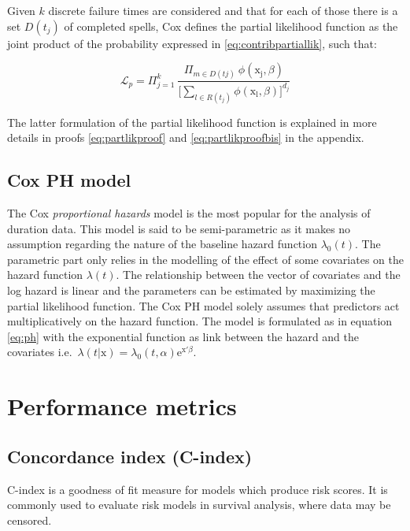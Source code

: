 \documentclass[
]{book}
\begin{document}
Given \(k\) discrete failure times are considered and that for each of those there is a set \(D(t_j)\) of completed spells, Cox defines the partial likelihood function as the joint product of the probability expressed in \eqref{eq:contribpartiallik}, such that:

\begin{equation}
  \mathcal{L}_p = \Pi_{j=1}^{k} \ \frac{\Pi_{m \in D(tj)} \ \phi(\mathrm{x_j}, \beta)}{\Big[\sum_{l \in R(t_j)} \phi(\mathrm{x_l}, \beta)\Big]^{d_j}}
  \label{eq:partlik}
\end{equation}

The latter formulation of the partial likelihood function is explained in more details in proofs \eqref{eq:partlikproof} and \eqref{eq:partlikproofbis} in the appendix.

\hypertarget{coxph}{%
\subsection{Cox PH model}\label{coxph}}

The Cox \emph{proportional hazards} model is the most popular for the analysis of duration data. This model is said to be semi-parametric as it makes no assumption regarding the nature of the baseline hazard function \(\lambda_0(t)\). The parametric part only relies in the modelling of the effect of some covariates on the hazard function \(\lambda(t)\). The relationship between the vector of covariates and the log hazard is linear and the parameters can be estimated by maximizing the partial likelihood function. The Cox PH model solely assumes that predictors act multiplicatively on the hazard function. The model is formulated as in equation \eqref{eq:ph} with the exponential function as link between the hazard and the covariates i.e.~\(\lambda(t|\pmb{\mathrm{x}}) = \lambda_0 (t,\alpha) \text{e}^{\pmb{\mathrm{x'}} \beta}\).

\hypertarget{performance-metrics}{%
\section{Performance metrics}\label{performance-metrics}}

\hypertarget{concordance-index-c-index}{%
\subsection{Concordance index (C-index)}\label{concordance-index-c-index}}

C-index is a goodness of fit measure for models which produce risk scores. It is commonly used to evaluate risk models in survival analysis, where data may be censored.
\end{document}

